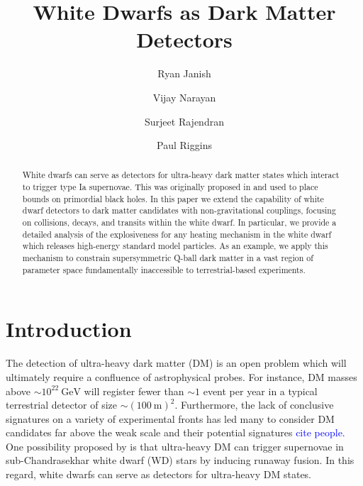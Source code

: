 \documentclass[twocolumn,showpacs,preprintnumbers,amsmath,amssymb,prd]{revtex4}
\newcommand{\GeV}{\text{GeV}}
\begin{document}
\title{White Dwarfs as Dark Matter Detectors}

\author{Ryan Janish}

\author{Vijay Narayan}

\author{Surjeet Rajendran}

\author{Paul Riggins}

\begin{abstract}

White dwarfs can serve as detectors for ultra-heavy dark matter states which interact to trigger type Ia supernovae.
This was originally proposed in \cite{Graham:2015apa} and used to  place bounds on primordial black holes.
In this paper we extend the capability of white dwarf detectors to dark matter candidates with non-gravitational couplings, focusing on collisions, decays, and transits within the white dwarf.
In particular, we provide a detailed analysis of the explosiveness for any heating mechanism in the white dwarf which releases high-energy standard model particles.
As an example, we apply this mechanism to constrain supersymmetric Q-ball dark matter in a vast region of parameter space fundamentally inaccessible to terrestrial-based experiments.


\end{abstract}
\maketitle


\section{Introduction}
\label{sec:Introduction}

The detection of ultra-heavy dark matter (DM) is an open problem which will ultimately require a confluence of astrophysical probes.
For instance, DM masses above $\sim 10^{22} ~\GeV$ will register fewer than $\sim 1$ event per year in a typical terrestrial detector of size $\sim (100 ~\text{m})^2$.
Furthermore, the lack of conclusive signatures on a variety of experimental fronts has led many to consider DM candidates far above the weak scale and their potential signatures \textcolor{blue}{cite people}.
One possibility proposed by \cite{Graham:2015apa} is that ultra-heavy DM can trigger supernovae in sub-Chandrasekhar white dwarf (WD) stars by inducing runaway fusion.
 In this regard, white dwarfs can serve as detectors for ultra-heavy DM states.
\end{document}
